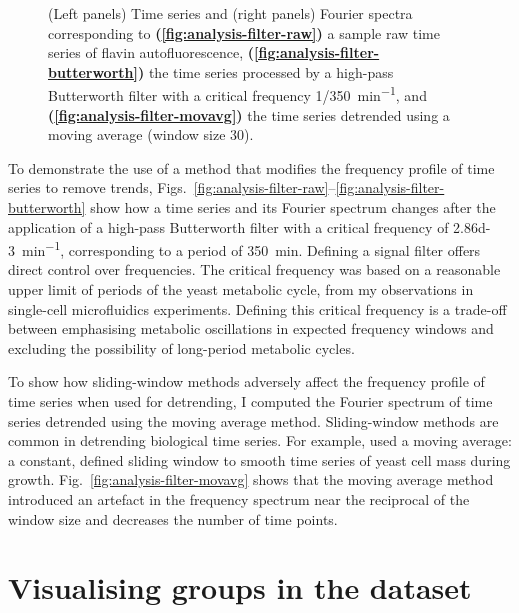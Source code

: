 \begin{figure}
  \caption{
    (Left panels) Time series and (right panels) Fourier spectra corresponding to
    \textbf{(\ref{fig:analysis-filter-raw})}
    a sample raw time series of flavin autofluorescence,
    \textbf{(\ref{fig:analysis-filter-butterworth})}
    the time series processed by a high-pass Butterworth filter with a critical frequency \SI[parse-numbers=false]{1/350}{\minute^{-1}}, and
    \textbf{(\ref{fig:analysis-filter-movavg})}
    the time series detrended using a moving average (window size 30).
  }
  \label{fig:analysis-filter}
\end{figure}

To demonstrate the use of a method that modifies the frequency profile of time series to remove trends, Figs.\ \ref{fig:analysis-filter-raw}--\ref{fig:analysis-filter-butterworth} show how a time series and its Fourier spectrum changes after the application of a high-pass Butterworth filter with a critical frequency of \SI{2.86d-3}{\minute^{-1}}, corresponding to a period of \SI{350}{\minute}.
Defining a signal filter offers direct control over frequencies.
The critical frequency was based on a reasonable upper limit of periods of the yeast metabolic cycle, from my observations in single-cell microfluidics experiments.
Defining this critical frequency is a trade-off between emphasising metabolic oscillations in expected frequency windows and excluding the possibility of long-period metabolic cycles.

To show how sliding-window methods adversely affect the frequency profile of time series when used for detrending, I computed the Fourier spectrum of time series detrended using the moving average method.
Sliding-window methods are common in detrending biological time series.
For example, \textcite{cunyHighresolutionMassMeasurements2022} used a moving average: a constant, defined sliding window to smooth time series of yeast cell mass during growth.
%
Fig.\ \ref{fig:analysis-filter-movavg} shows that the moving average method introduced an artefact in the frequency spectrum near the reciprocal of the window size and decreases the number of time points.


\section{Visualising groups in the dataset}
\label{sec:analysis-clustering}

